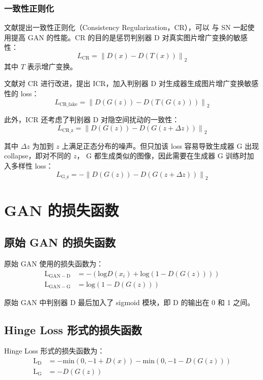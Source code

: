\subsubsection{一致性正则化}
文献提出一致性正则化（Consistency Regularization，CR），可以
与 SN 一起使用提高 GAN 的性能。CR 的目的是惩罚判别器 D 对真实图片增广变换的敏感性：
\begin{equation}
  L_{\mathrm{CR}} = \left\| D(x) - D(T(x)) \right\|_2
\end{equation}
其中 $T$ 表示增广变换。

文献对 CR 进行改进，提出 ICR，加入判别器 D 对生成器生成图片增广变换敏感性的 loss：
\begin{equation}
  L_{\mathrm{CR\_fake}} = \left\| D(G(z)) - D(T(G(z))) \right\|_2
\end{equation}

此外，ICR 还考虑了判别器 D 对隐空间扰动的一致性：
\begin{equation}
  L_{\mathrm{CR\_z}} = \left\| D(G(z)) - D(G(z+\Delta z)) \right\|_2
\end{equation}

其中 $\Delta z$ 为加到 $z$ 上满足正态分布的噪声。但只加该 loss 容易导致生成器 G
出现 collapse，即对不同的 $z$， G 都生成类似的图像，因此需要在生成器 G 训练时加
入多样性 loss：
\begin{equation}
  L_{\mathrm{G\_z}} = -\left\| D(G(z)) - D(G(z+\Delta z)) \right\|_2
\end{equation}

\section{GAN 的损失函数}
\subsection{原始 GAN 的损失函数}
原始 GAN 使用的损失函数为：
\begin{align}
  \label{equ:origin-GAN-loss}
  \mathrm{L}_{\mathrm{GAN-D}} & = - \left( \mathrm{log} D(x_i) + \mathrm{log} (1-D(G(z))) \right ) \\
  \mathrm{L}_{\mathrm{GAN-G}} & = \mathrm{log} (1-D(G(z)))
\end{align}

原始 GAN 中判别器 D 最后加入了 sigmoid 模块，即 D 的输出在 0 和 1 之间。

\subsection{Hinge Loss 形式的损失函数}
Hinge Loss 形式的损失函数为：
\begin{align}
  \label{equ:Hinge-GAN-loss}
  \mathrm{L}_{\mathrm{D}} & = -\mathrm{min}(0, -1 + D(x)) - \mathrm{min}(0,
  -1-D(G(z))) \\
  \mathrm{L}_{\mathrm{G}} & = -D(G(z))
\end{align}

